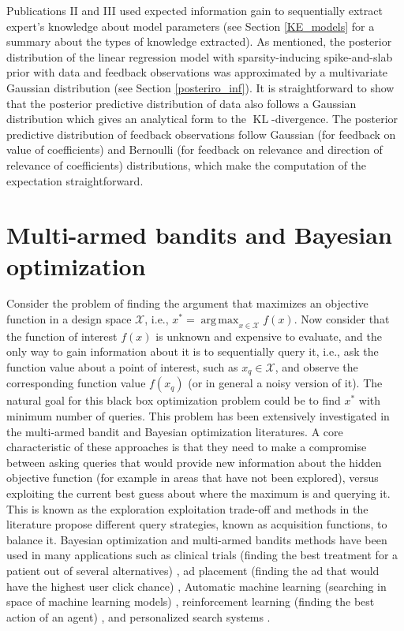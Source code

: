 \documentclass[dissertation,math,vertlayout,pdfa,colorlinks]{aaltoseries}
\DeclareMathOperator{\KLt}{KL}
\DeclareMathOperator*{\argmax}{arg\,max}
\begin{document}
Publications II and III used expected information gain to sequentially extract expert's knowledge about model parameters (see Section \ref{KE_models} for a summary about the types of knowledge extracted). As mentioned, the posterior distribution of the linear regression model with sparsity-inducing spike-and-slab prior with data and feedback observations was approximated by a multivariate Gaussian distribution (see Section \ref{posteriro_inf}). It is straightforward to show that the posterior predictive distribution of data also follows a Gaussian distribution which  gives an analytical form to the $\KLt$-divergence. The posterior predictive distribution of feedback observations follow Gaussian (for feedback on value of coefficients) and Bernoulli (for feedback on relevance and direction of relevance of coefficients) distributions, which make the computation of the expectation straightforward.     
 

\section{Multi-armed bandits and Bayesian optimization}\label{MAP_and_BO}

Consider the problem of finding the argument that maximizes an objective function in a design space $\mathcal{X}$, i.e., $x^* = \argmax_{x \in \mathcal{X}} f(x)$. Now consider that the function of interest $f(x)$ is unknown and expensive to evaluate, and the only way to gain information about it is to sequentially query it, i.e., ask the function value about a point of interest, such as $x_q \in \mathcal{X}$, and observe the corresponding function value $f(x_q)$ (or in general a noisy version of it). The natural goal for this black box optimization problem could be to find $x^*$ with minimum number of queries. This problem has been extensively investigated in the multi-armed bandit \cite{bubeck2012regret} and Bayesian optimization \cite{brochu2010tutorial,BO_review} literatures. A core characteristic of these approaches is that they need to make a compromise between asking queries that would provide new information about the hidden objective function (for example in areas that have not been explored), versus exploiting the current best guess about where the maximum is and querying it. This is known as the exploration exploitation trade-off and methods in the literature propose different query strategies, known as acquisition functions, to balance it. Bayesian optimization and multi-armed bandits methods have been used in many applications such as clinical trials (finding the best treatment for a patient out of several alternatives) \cite{bubeck2012regret}, ad placement (finding the ad that would have the highest user click chance) \cite{Bandit_IR}, Automatic machine learning (searching in space of machine learning models) \cite{hoffman2014correlation}, reinforcement learning (finding the best action of an agent) \cite{brochu2010tutorial}, and personalized search systems \cite{ruotsalo2015interactive}. 
\end{document}
